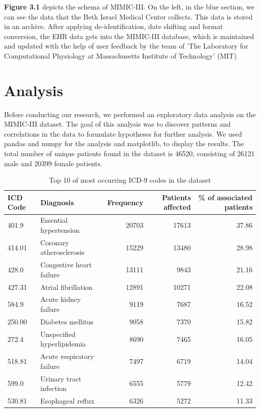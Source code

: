 \documentclass[11pt, a4paper, oneside]{book}
\begin{document}
\textbf{Figure 3.1} depicts the schema of MIMIC-III. On the left, in the blue section, we can see the data that the Beth Israel Medical Center collects. This data is stored in an archive. After applying de-identification, date shifting and format conversion, the EHR data gets into the MIMIC-III database, which is maintained and updated with the help of user feedback by the team of 'The Laboratory for Computational Physiology at Massachusetts Institute of Technology' (MIT) \citep{johnson2016mimic}
\section{Analysis}

Before conducting our research, we performed an exploratory data analysis on the MIMIC-III dataset. The goal of this analysis was to discover patterns and correlations in the data to formulate hypotheses for further analysis. We used pandas and numpy for the analysis and matplotlib, to display the results. The total number of unique patients found in the dataset is 46520, consisting of 26121 male and 20399 female patients.


\begin{table}
\begin{tabularx}{\textwidth}{X|l|r|r|r}
ICD Code & Diagnosis & Frequency & Patients affected & \% of associated patients \\
\hline
401.9 & Essential hypertension & 20703 & 17613 & 37.86\\
414.01 &  Coronary atherosclerosis & 15229 & 13480 & 28.98 \\
428.0 & Congestive heart failure &   13111 & 9843 &21.16\\
427.31 & Atrial fibrillation&    12891 & 10271 &  22.08\\
584.9 &  Acute kidney failure &  9119 & 7687& 16.52\\
250.00 & Diabetes mellitus &  9058 & 7370 & 15.82\\
272.4 & Unspecified hyperlipidemia & 8690 & 7465 & 16.05 \\
518.81 &  Acute respiratory failure & 7497 & 6719 & 14.04 \\
599.0 &   Urinary tract infection &  6555 & 5779 & 12.42 \\
530.81 & Esophageal reflux &  6326 & 5272 & 11.33\\
\end{tabularx}
\caption{\label{tab:top10-codes-dataset}Top 10 of most occurring ICD-9 codes in the dataset}
\end{table}
\end{document}

